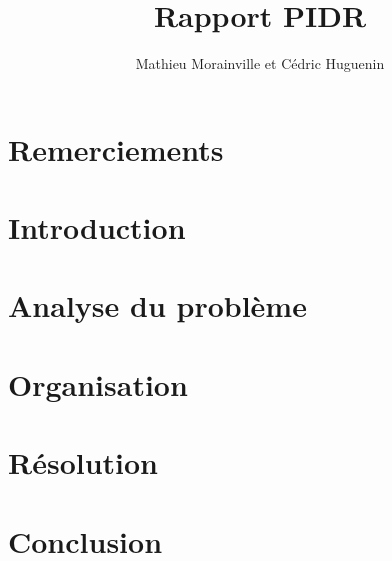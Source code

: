 \documentclass[12pt,a4paper]{article}
\author{Mathieu Morainville et Cédric Huguenin}
\title{Rapport PIDR}
\begin{document}
  
  \cleardoublepage %
  \sloppy          %
  \cleardoublepage
\section*{Remerciements}
    
  \tableofcontents %
  \cleardoublepage

\section{Introduction}
	



\newpage
\section{Analyse du problème}

%
%
\newpage
\section{Organisation}

%
%
\newpage
\section{Résolution}


%
%
\newpage
\section{Conclusion}
\end{document}
